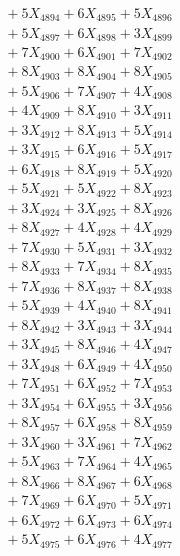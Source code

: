 \documentclass[a4paper,10pt]{article}
\begin{document}
{\begin{align}
&\;  + 5 X_{4894} + 6 X_{4895} + 5 X_{4896} \\[0.3ex]
&\;  + 5 X_{4897} + 6 X_{4898} + 3 X_{4899} \\[0.5ex]\allowbreak
&\;  + 7 X_{4900} + 6 X_{4901} + 7 X_{4902} \\[0.3ex]
&\;  + 8 X_{4903} + 8 X_{4904} + 8 X_{4905} \\[0.3ex]
&\;  + 5 X_{4906} + 7 X_{4907} + 4 X_{4908} \\[0.3ex]
&\;  + 4 X_{4909} + 8 X_{4910} + 3 X_{4911} \\[0.3ex]
&\;  + 3 X_{4912} + 8 X_{4913} + 5 X_{4914} \\[0.3ex]
&\;  + 3 X_{4915} + 6 X_{4916} + 5 X_{4917} \\[0.3ex]
&\;  + 6 X_{4918} + 8 X_{4919} + 5 X_{4920} \\[0.3ex]
&\;  + 5 X_{4921} + 5 X_{4922} + 8 X_{4923} \\[0.3ex]
&\;  + 3 X_{4924} + 3 X_{4925} + 8 X_{4926} \\[0.3ex]
&\;  + 8 X_{4927} + 4 X_{4928} + 4 X_{4929} \\[0.5ex]\allowbreak
&\;  + 7 X_{4930} + 5 X_{4931} + 3 X_{4932} \\[0.3ex]
&\;  + 8 X_{4933} + 7 X_{4934} + 8 X_{4935} \\[0.3ex]
&\;  + 7 X_{4936} + 8 X_{4937} + 8 X_{4938} \\[0.3ex]
&\;  + 5 X_{4939} + 4 X_{4940} + 8 X_{4941} \\[0.3ex]
&\;  + 8 X_{4942} + 3 X_{4943} + 3 X_{4944} \\[0.3ex]
&\;  + 3 X_{4945} + 8 X_{4946} + 4 X_{4947} \\[0.3ex]
&\;  + 3 X_{4948} + 6 X_{4949} + 4 X_{4950} \\[0.3ex]
&\;  + 7 X_{4951} + 6 X_{4952} + 7 X_{4953} \\[0.3ex]
&\;  + 3 X_{4954} + 6 X_{4955} + 3 X_{4956} \\[0.3ex]
&\;  + 8 X_{4957} + 6 X_{4958} + 8 X_{4959} \\[0.5ex]\allowbreak
&\;  + 3 X_{4960} + 3 X_{4961} + 7 X_{4962} \\[0.3ex]
&\;  + 5 X_{4963} + 7 X_{4964} + 4 X_{4965} \\[0.3ex]
&\;  + 8 X_{4966} + 8 X_{4967} + 6 X_{4968} \\[0.3ex]
&\;  + 7 X_{4969} + 6 X_{4970} + 5 X_{4971} \\[0.3ex]
&\;  + 6 X_{4972} + 6 X_{4973} + 6 X_{4974} \\[0.3ex]
&\;  + 5 X_{4975} + 6 X_{4976} + 4 X_{4977} \\[0.3ex]

\end{align}}
\end{document}

